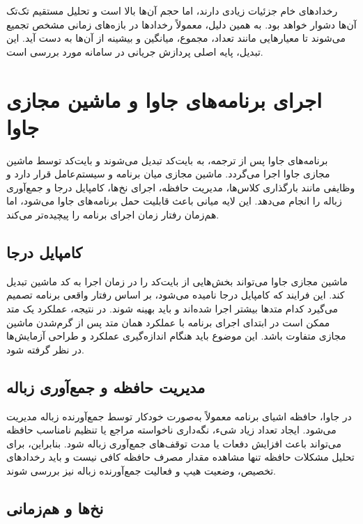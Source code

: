رخدادهای خام جزئیات زیادی دارند، اما حجم آن‌ها بالا است و تحلیل مستقیم تک‌تک
آن‌ها دشوار خواهد بود. به همین دلیل، معمولاً رخدادها در بازه‌های زمانی مشخص
تجمیع می‌شوند تا معیارهایی مانند تعداد، مجموع، میانگین و بیشینه از آن‌ها به دست
آید. این تبدیل، پایه اصلی پردازش جریانی در سامانه مورد بررسی است.

\section{اجرای برنامه‌های جاوا و ماشین مجازی جاوا}
\label{sec:jvm-background}

برنامه‌های جاوا پس از ترجمه، به بایت‌کد تبدیل می‌شوند و بایت‌کد توسط ماشین
مجازی جاوا اجرا می‌گردد. ماشین مجازی میان
برنامه و سیستم‌عامل قرار دارد و وظایفی مانند بارگذاری کلاس‌ها، مدیریت حافظه،
اجرای نخ‌ها، کامپایل درجا و جمع‌آوری زباله را انجام می‌دهد. این لایه میانی باعث
قابلیت حمل برنامه‌های جاوا می‌شود، اما هم‌زمان رفتار زمان اجرای برنامه را
پیچیده‌تر می‌کند.

\subsection{کامپایل درجا}

ماشین مجازی جاوا می‌تواند بخش‌هایی از بایت‌کد را در زمان اجرا به کد ماشین تبدیل
کند. این فرایند که کامپایل درجا نامیده
می‌شود، بر اساس رفتار واقعی برنامه تصمیم می‌گیرد کدام متدها بیشتر اجرا شده‌اند
و باید بهینه شوند. در نتیجه، عملکرد یک متد ممکن است در ابتدای اجرای برنامه با
عملکرد همان متد پس از گرم‌شدن ماشین مجازی متفاوت باشد. این موضوع باید هنگام
اندازه‌گیری عملکرد و طراحی آزمایش‌ها در نظر گرفته شود.

\subsection{مدیریت حافظه و جمع‌آوری زباله}

در جاوا، حافظه اشیای برنامه معمولاً به‌صورت خودکار توسط جمع‌آورنده زباله
مدیریت می‌شود. ایجاد تعداد زیاد شیء، نگه‌داری ناخواسته مراجع یا تنظیم نامناسب
حافظه می‌تواند باعث افزایش دفعات یا مدت توقف‌های جمع‌آوری زباله شود. بنابراین،
برای تحلیل مشکلات حافظه تنها مشاهده مقدار مصرف حافظه کافی نیست و باید رخدادهای
تخصیص، وضعیت هیپ و فعالیت جمع‌آورنده زباله نیز بررسی شوند.

\subsection{نخ‌ها و هم‌زمانی}

